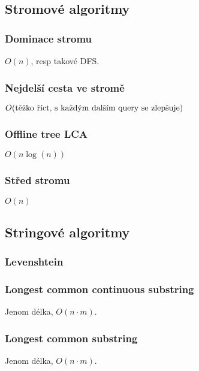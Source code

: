 \documentclass[10pt, a4paper]{article}
\begin{document}
\subsection{Stromové algoritmy}

\subsubsection{Dominace stromu}
$O(n)$, resp takové DFS.


\subsubsection{Nejdelší cesta ve stromě}
$O(\hbox{těžko říct, s každým dalším query se zlepšuje})$


\subsubsection{Offline tree LCA}
$O(n\log(n))$


\subsubsection{Střed stromu}
$O(n)$



\subsection{Stringové algoritmy}

\subsubsection{Levenshtein}


\subsubsection{Longest common continuous substring}
Jenom délka, $O(n \cdot m)$.


\subsubsection{Longest common substring}
Jenom délka, $O(n \cdot m)$.

\end{document}
